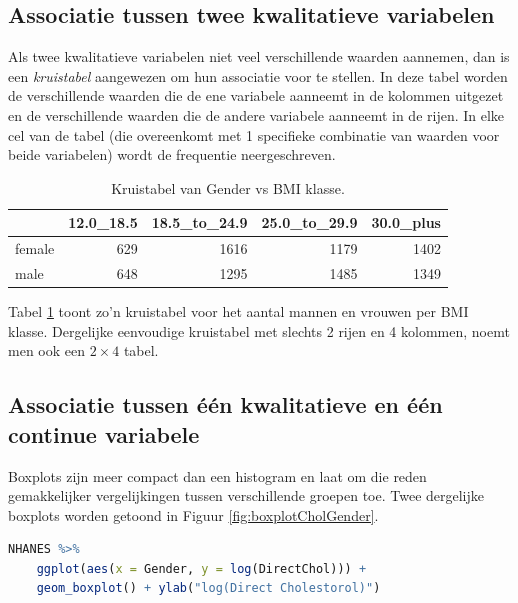\documentclass[
  12pt,dutch,coursenotes]{book}
\begin{document}
\hypertarget{subsec:kruistabel}{%
\subsection{Associatie tussen twee kwalitatieve variabelen}\label{subsec:kruistabel}}

Als twee kwalitatieve variabelen niet veel verschillende waarden aannemen,
dan is een \emph{kruistabel} aangewezen om hun associatie voor te stellen.
In deze tabel worden de verschillende waarden die de ene variabele aanneemt
in de kolommen uitgezet en de verschillende waarden die de andere variabele
aanneemt in de rijen. In elke cel van de tabel (die overeenkomt met 1
specifieke combinatie van waarden voor beide variabelen) wordt de frequentie
neergeschreven.

\begin{table}

\caption{\label{tab:genderBMI}Kruistabel van Gender vs BMI klasse.}
\centering
\begin{tabular}[t]{lrrrr}
\toprule
  & 12.0\_18.5 & 18.5\_to\_24.9 & 25.0\_to\_29.9 & 30.0\_plus\\
\midrule
female & 629 & 1616 & 1179 & 1402\\
male & 648 & 1295 & 1485 & 1349\\
\bottomrule
\end{tabular}
\end{table}

Tabel \ref{tab:genderBMI} toont zo'n kruistabel voor het aantal mannen en vrouwen per BMI klasse. Dergelijke eenvoudige kruistabel met slechts 2 rijen en 4 kolommen, noemt men ook een \(2\times 4\) tabel.

\hypertarget{subsec:asskwalcont}{%
\subsection{Associatie tussen één kwalitatieve en één continue variabele}\label{subsec:asskwalcont}}

Boxplots zijn meer compact dan een histogram en laat om die reden gemakkelijker vergelijkingen tussen verschillende groepen toe. Twee dergelijke boxplots
worden getoond in Figuur \ref{fig:boxplotCholGender}.

\begin{lstlisting}[language=R]
NHANES %>%
    ggplot(aes(x = Gender, y = log(DirectChol))) +
    geom_boxplot() + ylab("log(Direct Cholestorol)")
\end{lstlisting}
\end{document}
